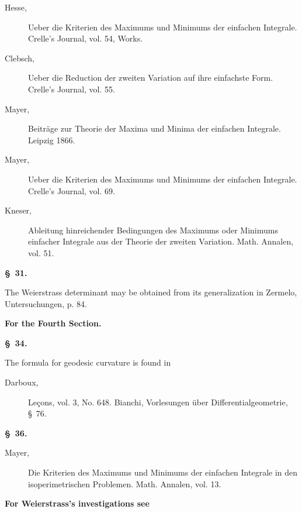 \documentclass[11pt,a4paper,leqno]{article}
\begin{document}
\begin{description}
\item[Hesse,] Ueber die Kriterien des Maximums und Minimums der einfachen
Integrale. Crelle's Journal, vol. 54, Works.

\item[Clebsch,] Ueber die Reduction der zweiten Variation auf ihre einfachste
Form. Crelle's Journal, vol. 55.

\item[Mayer,] Beiträge zur Theorie der Maxima und Minima der einfachen
Integrale. Leipzig 1866.

\item[Mayer,] Ueber die Kriterien des Maximums und Minimums der einfachen
Integrale. Crelle's Journal, vol. 69.

\item[Kneser,] Ableitung hinreichender Bedingungen des Maximums oder Minimums
einfacher Integrale aus der Theorie der zweiten Variation. Math. Annalen,
vol. 51.
\end{description}

\begin{center}{\bfseries \S~31.}\end{center}

\noindent The Weierstrass determinant may be obtained from its generalization
in Zermelo, Untersuchungen, p. 84.

\begin{center}
{\large\bfseries For the Fourth Section.}

{\bfseries \S~34.}
\end{center}

\noindent The formula for geodesic curvature is found in

\begin{description}
\item[Darboux,] Leçons, vol. 3, No. 648. Bianchi, Vorlesungen über
Differentialgeometrie, \S~76.
\end{description}

\begin{center}{\bfseries \S~36.}\end{center}

\begin{description}
\item[Mayer,] Die Kriterien des Maximums und Minimums der einfachen Integrale
in den isoperimetrischen Problemen. Math. Annalen, vol. 13.
\end{description}

\begin{center}{\bfseries For Weierstrass's investigations see}\end{center}
\end{document}
